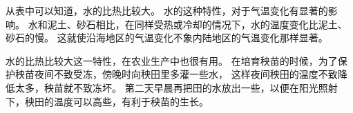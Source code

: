 从表中可以知道，水的比热比较大。
水的这种特性，对于气温变化有显著的影响。
水和泥土、砂石相比，在同样受热或冷却的情况下，水的温度变化比泥土、砂石的慢。
这就使沿海地区的气温变化不象内陆地区的气温变化那样显著。

水的比热比较大这一特性，在农业生产中也很有用。
在培育秧苗的时候，为了保护秧苗夜间不致受冻，傍晚时向秧田里多灌一些水，
这样夜间秧田的温度不致降低太多，秧苗就不致冻坏。
第二天早晨再把田的水放出一些，以便在阳光照射下，秧田的温度可以高些，有利于秧苗的生长。

